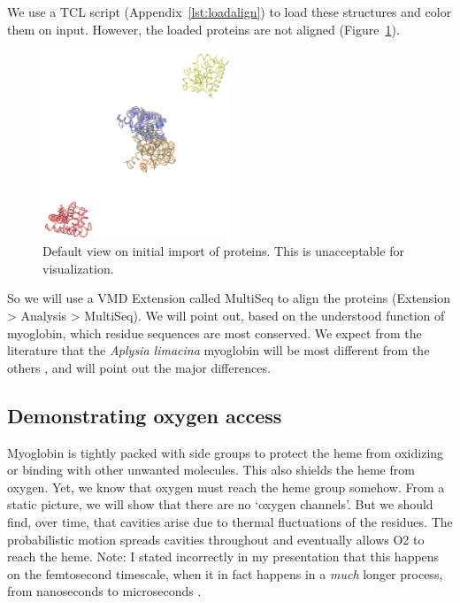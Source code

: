 \documentclass{article}
\begin{document}
We use a TCL script (Appendix~\ref{lst:loadalign}) to load these structures and color them on input.  However, the loaded proteins are not aligned (Figure~\ref{fig:loadalign}).

\begin{figure}
	\centering
	\includegraphics[width=0.5\textwidth]{loadalign.png}
	\caption{Default view on initial import of proteins.  This is unacceptable for visualization.}
	\label{fig:loadalign}
\end{figure}

So we will use a VMD Extension called MultiSeq to align the proteins (Extension > Analysis > MultiSeq).  We will point out, based on the understood function of myoglobin, which residue sequences are most conserved.  We expect from the literature that the \textit{Aplysia limacina} myoglobin will be most different from the others \cite{tutorial}, and will point out the major differences.

\subsection{Demonstrating oxygen access}

Myoglobin is tightly packed with side groups to protect the heme from oxidizing or binding with other unwanted molecules.  This also shields the heme from oxygen.  Yet, we know that oxygen must reach the heme group somehow.  From a static picture, we will show that there are no `oxygen channels'.  But we should find, over time, that cavities arise due to thermal fluctuations of the residues.  The probabilistic motion spreads cavities throughout and eventually allows O2 to reach the heme.  Note: I stated incorrectly in my presentation that this happens on the femtosecond timescale, when it in fact happens in a \emph{much} longer process, from nanoseconds to microseconds \cite{tutorial}.
\end{document}
